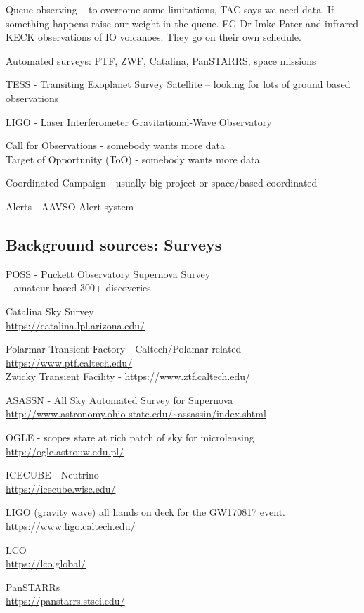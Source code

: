 \documentclass[letter,11pt,oneside]{article}
\begin{document}
Queue observing -- to overcome some limitations, TAC says we need
   data.  If something happens raise our weight in the queue. EG Dr Imke
   Pater and infrared KECK observations of IO volcanoes. They go on their
   own schedule.

Automated surveys: PTF, ZWF, Catalina, PanSTARRS, space missions

TESS - Transiting Exoplanet Survey Satellite -- looking for lots of
   ground based observations

LIGO - Laser Interferometer Gravitational-Wave Observatory 

Call for Observations - somebody wants more data \\
Target of Opportunity  (ToO) - somebody wants more data

Coordinated Campaign - usually big project or space/based coordinated

Alerts - AAVSO Alert system

\subsection{Background sources: Surveys}

POSS - Puckett Observatory Supernova Survey \\
 -- amateur based 300+ discoveries

Catalina Sky Survey   \\
   \url{https://catalina.lpl.arizona.edu/}

Polarmar Transient Factory - Caltech/Polamar related \url{https://www.ptf.caltech.edu/} \\
Zwicky Transient Facility -  \url{https://www.ztf.caltech.edu/ }

ASASSN - All Sky Automated Survey for Supernova \\
   \url{http://www.astronomy.ohio-state.edu/~assassin/index.shtml}
   
OGLE    - scopes stare at rich patch of sky for microlensing \\
  \url{http://ogle.astrouw.edu.pl/}
 
ICECUBE - Neutrino  \\
\url{https://icecube.wisc.edu/}

LIGO (gravity wave) all hands on deck for the GW170817 event. \\
\url{https://www.ligo.caltech.edu/}

LCO \\
\url{https://lco.global/}

PanSTARRs \\
\url{https://panstarrs.stsci.edu/}
\end{document}
